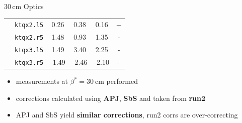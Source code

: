 \documentclass[4pt,usenames,dvipsnames,aspectratio=169]{beamer}
\newcommand{\highl}[1]{\textbf{#1}}
\begin{document}
\begin{frame}{30\,cm Optics }
\begin{center}
{{\begin{tabular}{l|lSSS|c|}
         & \texttt{ktqx2.l5} & \color{RunTwored} 0.26 & \color{APJgreen} 0.38 & \color{SbSorange} 0.16 & + \\
         & \texttt{ktqx2.r5} & \color{RunTwored} 1.48 & \color{APJgreen} 0.93 & \color{SbSorange} 1.35 & - \\
         & \texttt{ktqx3.l5} & \color{RunTwored} 1.49 & \color{APJgreen} 3.40 & \color{SbSorange} 2.25 & - \\
         & \texttt{ktqx3.r5} & \color{RunTwored}-1.49 & \color{APJgreen}-2.46 & \color{SbSorange}-2.10 & + \\\hline \midrule
        \end{tabular} 
        }
        }
    \end{center}
    \begin{itemize}
        \item measurements at $\beta^*=\SI{30}{\centi\meter}$ performed
        \item corrections calculated using \highl{APJ}, \highl{SbS} and taken from \highl{run2}
        \item APJ and SbS yield \highl{similar corrections},
            run2 corrs are over-correcting
    \end{itemize}
\end{frame}
\end{document}
